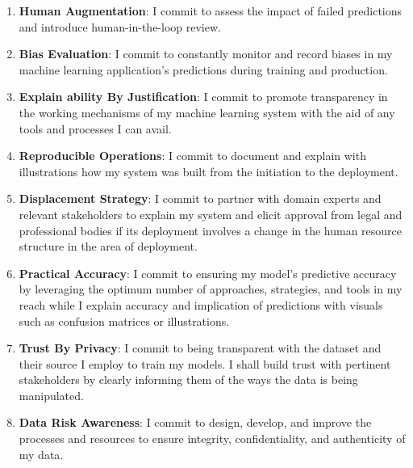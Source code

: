 \begin{enumerate}
	\item \textbf{Human Augmentation}: I commit to assess the impact of failed predictions and introduce human-in-the-loop review.
	\item \textbf{Bias Evaluation}: I commit to constantly monitor and record biases in my machine learning application's predictions during training and production.
	\item \textbf{Explain ability By Justification}: I commit to promote transparency in the working mechanisms of my machine learning system with the aid of any tools and processes I can avail.
	\item \textbf{Reproducible Operations}: I commit to document and explain with illustrations how my system was built from the initiation to the deployment.
	\item \textbf{Displacement Strategy}: I commit to partner with domain experts and relevant stakeholders to explain my system and elicit approval from legal and professional bodies if its deployment involves a change in the human resource structure in the area of deployment.
	\item \textbf{Practical Accuracy}: I commit to ensuring my model's predictive accuracy by leveraging the optimum number of approaches, strategies, and tools in my reach while I explain accuracy and implication of predictions with visuals such as confusion matrices or illustrations.
	\item \textbf{Trust By Privacy}: I commit to being transparent with the dataset and their source I employ to train my models. I shall build trust with pertinent stakeholders by clearly informing them of the ways the data is being manipulated.
	\item \textbf{Data Risk Awareness}: I commit to design, develop, and improve the processes and resources to ensure integrity, confidentiality, and authenticity of my data. 
\end{enumerate}